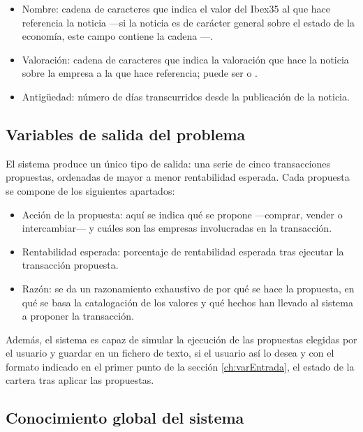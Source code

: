 \documentclass[a4paper, 11pt, titlepage]{article}
\begin{document}
\begin{enumerate}
        \begin{itemize}
            \item Nombre: cadena de caracteres que indica el valor del Ibex35 al que hace referencia la noticia ---si la noticia es de carácter general sobre el estado de la economía, este campo contiene la cadena ---.
            \item Valoración: cadena de caracteres que indica la valoración que hace la noticia sobre la empresa a la que hace referencia; puede ser  o .
            \item Antigüedad: número de días transcurridos desde la publicación de la noticia.
        \end{itemize}
    \end{enumerate}

    \subsection{Variables de salida del problema}
    \label{ch:defPropuestas}

    El sistema produce un único tipo de salida: una serie de cinco transacciones propuestas, ordenadas de mayor a menor rentabilidad esperada. Cada propuesta se compone de los siguientes apartados:
    \begin{itemize}
        \item Acción de la propuesta: aquí se indica qué se propone ---comprar, vender o intercambiar--- y cuáles son las empresas involucradas en la transacción.
        \item Rentabilidad esperada: porcentaje de rentabilidad esperada tras ejecutar la transacción propuesta.
        \item Razón: se da un razonamiento exhaustivo de por qué se hace la propuesta, en qué se basa la catalogación de los valores y qué hechos han llevado al sistema a proponer la transacción.
    \end{itemize}

    Además, el sistema es capaz de simular la ejecución de las propuestas elegidas por el usuario y guardar en un fichero de texto, si el usuario así lo desea y con el formato indicado en el primer punto de la sección \ref{ch:varEntrada}, el estado de la cartera tras aplicar las propuestas.

    \subsection{Conocimiento global del sistema}
\end{document}
